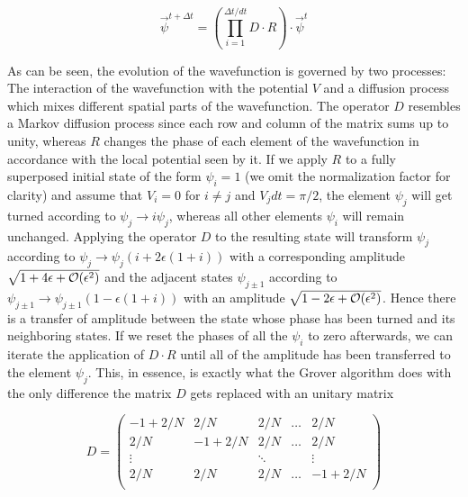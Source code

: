 \begin{equation}
\vec{\psi}^{t+\Delta t} = \left(\prod\limits_{i = 1}^{\Delta t/dt} D\cdot R\right)\cdot \vec{\psi}^{t}
\end{equation}

As can be seen, the evolution of the wavefunction is governed by two processes: The interaction of the wavefunction with the potential $V$ and a diffusion process which mixes different spatial parts of the wavefunction. The operator $D$ resembles a Markov diffusion process since each row and column of the matrix sums up to unity, whereas $R$ changes the phase of each element of the wavefunction in accordance with the local potential seen by it. If we apply $R$ to a fully superposed initial state of the form $\psi_i = 1$ (we omit the normalization factor for clarity) and assume that $V_i = 0$ for $i \ne j$ and $V_j dt = \pi/2$, the element $\psi_j$ will get turned according to $\psi_j \to i\psi_j $, whereas all other elements $\psi_i$ will remain unchanged. Applying the operator $D$ to the resulting state will transform $\psi_j$ according to $\psi_j \to \psi_j(i+2\epsilon(1+i))$ with a corresponding amplitude $\sqrt{1+4\epsilon+\begin{mathcal}O\end{mathcal}(\epsilon^2)}$ and the adjacent states $\psi_{j\pm 1}$ according to $\psi_{j\pm 1} \to \psi_{j\pm 1}(1-\epsilon(1+i))$ with an amplitude $\sqrt{1-2\epsilon +\begin{mathcal}O\end{mathcal}(\epsilon^2)}$. Hence there is a transfer of amplitude between the state whose phase has been turned and its neighboring states. If we reset the phases of all the $\psi_i$ to zero afterwards, we can iterate the application of $D\cdot R$ until all of the amplitude has been transferred to the element $\psi_j$. This, in essence, is exactly what the Grover algorithm does with the only difference the matrix $D$ gets replaced with an unitary matrix

\begin{equation}
D = \left( \begin{array}{ccccc}
	-1+2/N & 2/N & 2/N & \hdots & 2/N \\
	2/N & -1 + 2/N & 2/N & \hdots & 2/N \\
	\vdots & & \ddots &  & \vdots \\
	2/N & 2/N & 2/N & \hdots & -1 + 2/N \\ 
	\end{array} \right) \label{eq:GroverDiffusionOperator}
\end{equation}

